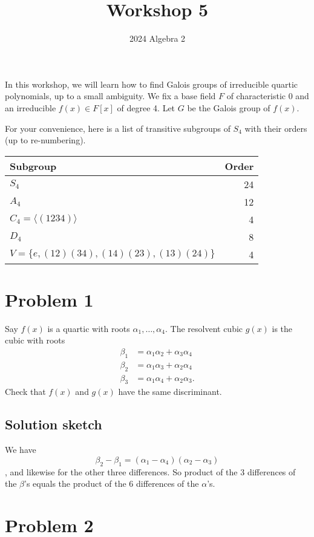 \documentclass[12pt]{amsart}
\author{2024 Algebra 2}
\date{}
\title{Workshop 5}
\begin{document}
\maketitle
In this workshop, we will learn how to find Galois groups of irreducible quartic polynomials, up to a small ambiguity.
We fix a base field \(F\) of characteristic 0 and an irreducible \(f(x) \in F[x]\) of degree 4.
Let \(G\) be the Galois group of \(f(x)\).

For your convenience, here is a list of transitive subgroups of \(S_{4}\) with their orders (up to re-numbering).

\begin{center}
\begin{tabular}{lr}
Subgroup & Order\\
\hline
\(S_4\) & 24\\
\(A_4\) & 12\\
\(C_4 = \langle (1234) \rangle\) & 4\\
\(D_4\) & 8\\
\(V = \{e,(12)(34), (14)(23), (13)(24) \}\) & 4\\
\hline
\end{tabular}
\end{center}
\section{Problem 1}
\label{sec:orga0bc632}

Say \(f(x)\) is a quartic with roots \(\alpha_1, \dots, \alpha_4\).
The resolvent cubic \(g(x)\) is the cubic with roots 
\begin{align*}
\beta_1 &= \alpha_1\alpha_2 + \alpha_3\alpha_4\\
\beta_2 &= \alpha_1\alpha_3 + \alpha_2\alpha_4\\
\beta_3 &= \alpha_1\alpha_4 + \alpha_2\alpha_3.
\end{align*}
Check that \(f(x)\) and \(g(x)\) have the same discriminant.
\subsection{Solution sketch}
\label{sec:org9a2846f}
We have \[\beta_2 - \beta_1 = (\alpha_1-\alpha_4)(\alpha_2-\alpha_3)\], and likewise for the other three differences.
So product of the 3 differences of the \(\beta\)'s equals the product of the 6 differences of the \(\alpha\)'s.
\section{Problem 2}
\label{sec:org4308624}
\end{document}
